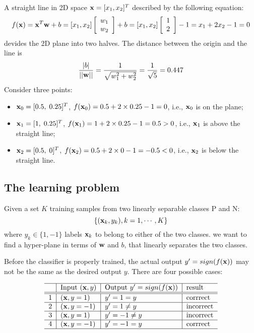 A straight line in 2D space ${\bf x}=[x_1, x_2]^T$ described by the following
equation:
\[ 
f({\bf x})={\bf x}^T {\bf w}+b=[x_1,x_2]
\left[ \begin{array}{c} w_1 \\ w_2 \end{array} \right]+b
=[x_1,x_2]\left[ \begin{array}{c} 1 \\ 2 \end{array} \right]-1
=x_1+2x_2-1=0 \]
devides the 2D plane into two halves. The distance between the origin and the
line is 
\[
\frac{|b|}{||{\bf w}||}=\frac{1}{\sqrt{w_1^2+w_2^2}}=\frac{1}{\sqrt{5}}=0.447
\]
Consider three points:
\begin{itemize}
\item ${\bf x}_0=[0.5,\;0.25]^T$, $f({\bf x}_0)=0.5+2\times 0.25-1=0$, i.e., 
  ${\bf x}_0$ is on the plane;
\item ${\bf x}_1=[1,\;0.25]^T$, $f({\bf x}_1)=1+2\times 0.25-1=0.5>0$, i.e., 
  ${\bf x}_1$ is above the straight line;
\item ${\bf x}_2=[0.5,\;0]^T$, $f({\bf x}_2)=0.5+2\times 0-1=-0.5<0$, i.e., 
  ${\bf x}_2$ is below the straight line.
\end{itemize}


\subsection*{The learning problem}

Given a set $K$ training samples from two linearly separable classes P and N:
\[	\{ ({\bf x}_k, y_k), k=1,\cdots,K \}	\]
where $y_k \in \{1,-1\}$ labels ${\bf x}_k$ to belong to either of the two 
classes. we want to find a hyper-plane in terms of ${\bf w}$ and $b$, that
linearly separates the two classes.

Before the classifier is properly trained, the actual output $y'=sign(f({\bf x}))$ 
may not be the same as the desired output $y$. There are four possible cases:

\[ 
\begin{tabular}{c|l|l|l} \hline
& Input $({\bf x},y)$ & Output $y'=sign(f({\bf x}))$ & result	\\ \hline \hline
1 & $({\bf x},y= 1)$ & $y'= 1=  y $ & corrrect  \\ \hline
2 & $({\bf x},y=-1)$ & $y'= 1\ne y$ & incorrect \\ \hline
3 & $({\bf x},y= 1)$ & $y'=-1\ne y$ & incorrect \\ \hline
4 & $({\bf x},y=-1)$ & $y'=-1=  y $ & corrrect  \\ \hline
\end{tabular} \]



